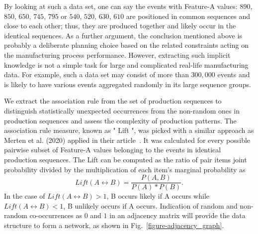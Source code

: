 By looking at such a data set, one can say the events with Feature-A values: $890$, $850$, $650$, $745$, $795$ or $540$, $520$, $630$, $610$ are positioned in common sequences and close to each other; thus, they are produced together and likely occur in the identical sequences. As a further argument, the conclusion mentioned above is probably a deliberate planning choice based on the related constraints acting on the manufacturing process performance. However, extracting such implicit knowledge is not a simple task for large and complicated real-life manufacturing data. For example, such a data set may consist of more than $300,000$ events and is likely to have various events aggregated randomly in its large sequence groups.

We extract the association rule from the set of production sequences to distinguish statistically unexpected occurrences from the non-random ones in production sequences and assess the complexity of production patterns. The association rule measure, known as " Lift ", was picked with a similar approach as Merten et al. (2020) applied in their article~\cite{MERTEN2020}. It was calculated for every possible pairwise subset of Feature-A values belonging to the events in identical production sequences. The Lift can be computed as the ratio of pair items joint probability divided by the multiplication of each item's marginal probability as
\begin{equation} \tag{6}
	Lift(A\leftrightarrow B)=\frac{P(A,B)}{P(A)*P(B)}.
	\label{lift}
\end{equation}
In the case of $Lift(A\leftrightarrow B)> 1$, B occurs likely if A occurs while $Lift(A\leftrightarrow B)< 1$, B unlikely occurs if A occurs. Indication of random and non-random co-occurrences as $0$ and $1$ in an adjacency matrix will provide the data structure to form a network, as shown in Fig.~\ref{figure-adjacency_graph}.

